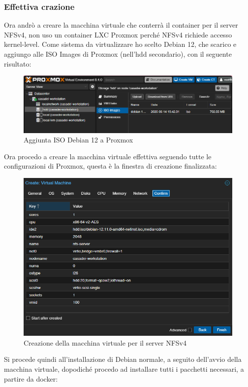 \documentclass[a4paper]{article}
\begin{document}
\subsubsection{Effettiva crazione}
Ora andrò a creare la macchina virtuale che conterrà il container per il server NFSv4, non uso un container LXC Proxmox
perché NFSv4 richiede accesso kernel-level. Come sistema da virtualizzare ho scelto Debian 12, che scarico e aggiungo alle ISO
Images di Proxmox (nell'hdd secondario), con il seguente risultato:
\begin{figure}[H]
    \centering
    \includegraphics[scale=0.42]{images/IsoDebian12Caricata1.png}
    \caption{Aggiunta ISO Debian 12 a Proxmox}
\end{figure}
Ora procedo a creare la macchina virtuale effettiva seguendo tutte le configurazioni di
Proxmox, questa è la finestra di creazione finalizzata:
\begin{figure}[H]
    \centering
    \includegraphics[scale=0.60]{images/VMNFSServer.png}
    \caption{Creazione della macchina virtuale per il server NFSv4}
\end{figure}
Si procede quindi all'installazione di Debian normale, a seguito dell'avvio della macchina
virtuale, dopodiché procedo ad installare tutti i pacchetti necessari, a partire da docker:
\end{document}
